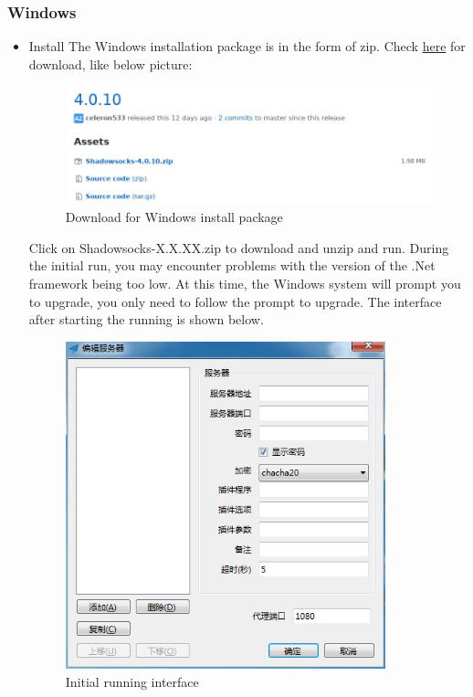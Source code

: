 \documentclass[12pt]{wx672article}
\begin{document}
\subsubsection*{Windows}
\label{sec:orgdd68f4b}
\begin{itemize}
\item Install
\label{sec:org1340460}
The Windows installation package is in the form of zip. Check \href{https://github.com/shadowsocks/shadowsocks-windows/releases}{here} for download,
like below picture:
\begin{figure}[!htb]
\centering
\includegraphics[width=5000px]{./images/windows1.jpg}
\caption{\label{fig:org9210bc0}
Download for Windows install package}
\end{figure}

Click on Shadowsocks-X.X.XX.zip to download and unzip and run. During the initial run, you
may encounter problems with the version of the .Net framework being too low. At this time,
the Windows system will prompt you to upgrade, you only need to follow the prompt to
upgrade. The interface after starting the running is shown below.
\begin{figure}[!htb]
\centering
\includegraphics[width=350px]{./images/windows2.jpg}
\caption{\label{fig:orgcdb2573}
Initial running interface}
\end{figure}


\end{itemize}
\end{document}
